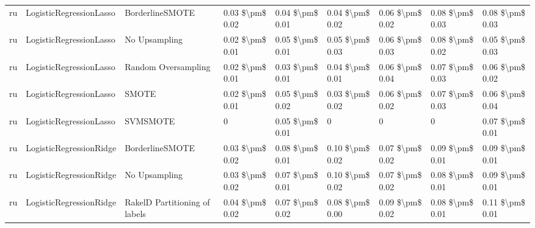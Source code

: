 \begin{tabular}{lllllllll}
      ru &         LogisticRegressionLasso &               BorderlineSMOTE & 0.03 \$\textbackslash pm\$ 0.02 &           0.04 \$\textbackslash pm\$ 0.01 &       0.04 \$\textbackslash pm\$ 0.02 &        0.06 \$\textbackslash pm\$ 0.02 &                         0.08 \$\textbackslash pm\$ 0.03 &     0.08 \$\textbackslash pm\$ 0.03 \\
      ru &         LogisticRegressionLasso &                 No Upsampling & 0.02 \$\textbackslash pm\$ 0.01 &           0.05 \$\textbackslash pm\$ 0.01 &       0.05 \$\textbackslash pm\$ 0.03 &        0.06 \$\textbackslash pm\$ 0.03 &                         0.08 \$\textbackslash pm\$ 0.02 &     0.05 \$\textbackslash pm\$ 0.03 \\
      ru &         LogisticRegressionLasso &           Random Oversampling & 0.02 \$\textbackslash pm\$ 0.01 &           0.03 \$\textbackslash pm\$ 0.01 &       0.04 \$\textbackslash pm\$ 0.01 &        0.06 \$\textbackslash pm\$ 0.04 &                         0.07 \$\textbackslash pm\$ 0.03 &     0.06 \$\textbackslash pm\$ 0.02 \\
      ru &         LogisticRegressionLasso &                         SMOTE & 0.02 \$\textbackslash pm\$ 0.01 &           0.05 \$\textbackslash pm\$ 0.02 &       0.03 \$\textbackslash pm\$ 0.02 &        0.06 \$\textbackslash pm\$ 0.02 &                         0.07 \$\textbackslash pm\$ 0.03 &     0.06 \$\textbackslash pm\$ 0.04 \\
      ru &         LogisticRegressionLasso &                      SVMSMOTE &               0 &           0.05 \$\textbackslash pm\$ 0.01 &                     0 &                      0 &                                       0 &     0.07 \$\textbackslash pm\$ 0.01 \\
      ru &         LogisticRegressionRidge &               BorderlineSMOTE & 0.03 \$\textbackslash pm\$ 0.02 &           0.08 \$\textbackslash pm\$ 0.01 &       0.10 \$\textbackslash pm\$ 0.02 &        0.07 \$\textbackslash pm\$ 0.02 &                         0.09 \$\textbackslash pm\$ 0.01 &     0.09 \$\textbackslash pm\$ 0.01 \\
      ru &         LogisticRegressionRidge &                 No Upsampling & 0.03 \$\textbackslash pm\$ 0.02 &           0.07 \$\textbackslash pm\$ 0.01 &       0.10 \$\textbackslash pm\$ 0.02 &        0.07 \$\textbackslash pm\$ 0.02 &                         0.08 \$\textbackslash pm\$ 0.01 &     0.09 \$\textbackslash pm\$ 0.01 \\
      ru &         LogisticRegressionRidge & RakelD Partitioning of labels & 0.04 \$\textbackslash pm\$ 0.02 &           0.07 \$\textbackslash pm\$ 0.02 &       0.08 \$\textbackslash pm\$ 0.00 &        0.09 \$\textbackslash pm\$ 0.02 &                         0.08 \$\textbackslash pm\$ 0.01 &     0.11 \$\textbackslash pm\$ 0.01 \\

\end{tabular}
